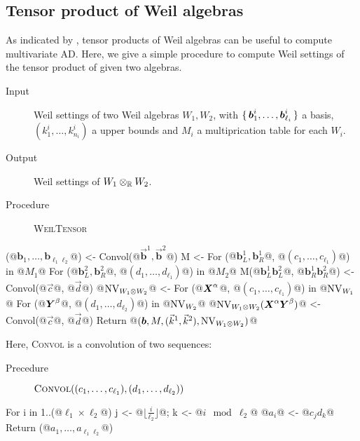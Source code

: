 \documentclass[%
  sigconf,authorversion,screen]{acmart}
\begin{document}
\subsection{Tensor product of Weil algebras}
\label{sec:tensor-algorithm}
As indicated by , tensor products of Weil algebras can be useful to compute multivariate AD.
Here, we give a simple procedure to compute Weil settings of the tensor product of given two algebras.

\begin{algorithm}[WeilTensor]\label{alg:weil-tensor}
\hfill\vspace{-.25em}
\begin{description}
  \item[Input] Weil settings of two Weil algebras $W_1, W_2$,
  with $\set{\boldsymbol{b}_1^i, \dots, \boldsymbol{b}_{\ell_i}^i}$ a basis,
  $(k^i_1, \dots, k^i_{n_i})$ a upper bounds and $M_i$ a multiprication table for each $W_i$.
  \item[Output] Weil settings of $W_1 \otimes_{\mathbb{R}} W_2$.
  \item[Procedure] {\upshape \textsc{WeilTensor}}
\end{description}
\begin{alg}
(@$\boldsymbol{b}_1, \dots, \boldsymbol{b}_{\ell_1 \ell_2}$@) <- Convol(@$\vec{\boldsymbol{b}}^1, \vec{\boldsymbol{b}}^2$@)
M <- {}
For ({@$\boldsymbol{b}^1_L, \boldsymbol{b}^1_R$@}, @$(c_1,\dots,c_{\ell_1})$@) in @$M_1$@
  For ({@$\boldsymbol{b}^2_L, \boldsymbol{b}^2_R$@}, @$(d_1,\dots,d_{\ell_1})$@) in @$M_2$@
    M({@$\boldsymbol{b}^1_L \boldsymbol{b}^2_L$@, @$\boldsymbol{b}^1_R \boldsymbol{b}^2_R$@}) <- Convol(@$\vec{c}$@, @$\vec{d}$@)
@$\operatorname{NV}_{W_1 \otimes W_2}$@ <- {}
For (@$\boldsymbol{X}^\alpha$@, @$(c_1, \dots, c_{\ell_1})$@) in @$\operatorname{NV}_{W_1}$@
  For (@$\boldsymbol{Y}^\beta$@, @$(d_1,\dots,d_{\ell_2})$@) in @$\operatorname{NV}_{W_2}$@
    @$\operatorname{NV}_{W_1 \otimes W_2}(\boldsymbol{X}^\alpha\boldsymbol{Y}^\beta)$@ <- Convol(@$\vec{c}$@, @$\vec{d}$@)
Return @$(\boldsymbol{b}, M, (\vec{k}^1, \vec{k}^2), \operatorname{NV}_{W_1 \otimes W_2})$@
\end{alg}

Here, {\upshape \textsc{Convol}} is a convolution of two sequences:
\begin{description}
  \item[Precedure] $\mathop{\text{\upshape\scshape Convol}}((c_1, \dots, c_{\ell_1}), (d_1, \dots, d_{\ell_2}))$
\end{description}
\begin{alg}
For i in 1..(@$\ell_1 \times \ell_2$@)
  j <- @$\lfloor \frac{i}{\ell_2} \rfloor$@; k <- @$i \mod{\ell_2}$@
  @$a_i$@ <- @$c_j d_k$@
Return (@$a_1, \dots, a_{\ell_1 \ell_2}$@)
\end{alg}
\end{algorithm}
\end{document}
